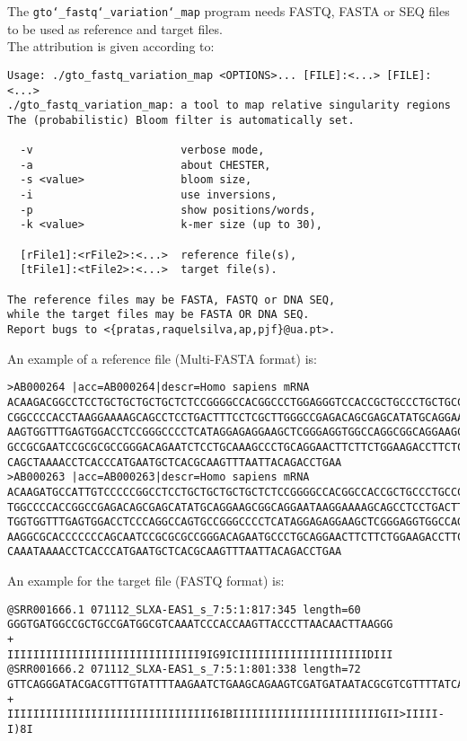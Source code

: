 The \texttt{gto\char`_fastq\char`_variation\char`_map} program needs FASTQ, FASTA or SEQ files to be used as reference and target files.\\
The attribution is given according to:
\begin{lstlisting}
Usage: ./gto_fastq_variation_map <OPTIONS>... [FILE]:<...> [FILE]:<...>
./gto_fastq_variation_map: a tool to map relative singularity regions  
The (probabilistic) Bloom filter is automatically set.   
                                                         
  -v                       verbose mode,                 
  -a                       about CHESTER,                
  -s <value>               bloom size,                   
  -i                       use inversions,               
  -p                       show positions/words,         
  -k <value>               k-mer size (up to 30),        
                                                         
  [rFile1]:<rFile2>:<...>  reference file(s),            
  [tFile1]:<tFile2>:<...>  target file(s).               
                                                         
The reference files may be FASTA, FASTQ or DNA SEQ,      
while the target files may be FASTA OR DNA SEQ.          
Report bugs to <{pratas,raquelsilva,ap,pjf}@ua.pt>.
\end{lstlisting}
An example of a reference file (Multi-FASTA format) is:
\begin{lstlisting}
>AB000264 |acc=AB000264|descr=Homo sapiens mRNA 
ACAAGACGGCCTCCTGCTGCTGCTGCTCTCCGGGGCCACGGCCCTGGAGGGTCCACCGCTGCCCTGCTGCCATTGTCCC
CGGCCCCACCTAAGGAAAAGCAGCCTCCTGACTTTCCTCGCTTGGGCCGAGACAGCGAGCATATGCAGGAAGCGGCAGG
AAGTGGTTTGAGTGGACCTCCGGGCCCCTCATAGGAGAGGAAGCTCGGGAGGTGGCCAGGCGGCAGGAAGCAGGCCAGT
GCCGCGAATCCGCGCGCCGGGACAGAATCTCCTGCAAAGCCCTGCAGGAACTTCTTCTGGAAGACCTTCTCCACCCCCC
CAGCTAAAACCTCACCCATGAATGCTCACGCAAGTTTAATTACAGACCTGAA
>AB000263 |acc=AB000263|descr=Homo sapiens mRNA 
ACAAGATGCCATTGTCCCCCGGCCTCCTGCTGCTGCTGCTCTCCGGGGCCACGGCCACCGCTGCCCTGCCCCTGGAGGG
TGGCCCCACCGGCCGAGACAGCGAGCATATGCAGGAAGCGGCAGGAATAAGGAAAAGCAGCCTCCTGACTTTCCTCGCT
TGGTGGTTTGAGTGGACCTCCCAGGCCAGTGCCGGGCCCCTCATAGGAGAGGAAGCTCGGGAGGTGGCCAGGCGGCAGG
AAGGCGCACCCCCCCAGCAATCCGCGCGCCGGGACAGAATGCCCTGCAGGAACTTCTTCTGGAAGACCTTCTCCTCCTG
CAAATAAAACCTCACCCATGAATGCTCACGCAAGTTTAATTACAGACCTGAA
\end{lstlisting}
An example for the target file (FASTQ format) is:
\begin{lstlisting}
@SRR001666.1 071112_SLXA-EAS1_s_7:5:1:817:345 length=60
GGGTGATGGCCGCTGCCGATGGCGTCAAATCCCACCAAGTTACCCTTAACAACTTAAGGG
+
IIIIIIIIIIIIIIIIIIIIIIIIIIIIII9IG9ICIIIIIIIIIIIIIIIIIIIIDIII
@SRR001666.2 071112_SLXA-EAS1_s_7:5:1:801:338 length=72
GTTCAGGGATACGACGTTTGTATTTTAAGAATCTGAAGCAGAAGTCGATGATAATACGCGTCGTTTTATCAT
+
IIIIIIIIIIIIIIIIIIIIIIIIIIIIIIII6IBIIIIIIIIIIIIIIIIIIIIIIIGII>IIIII-I)8I
\end{lstlisting}

